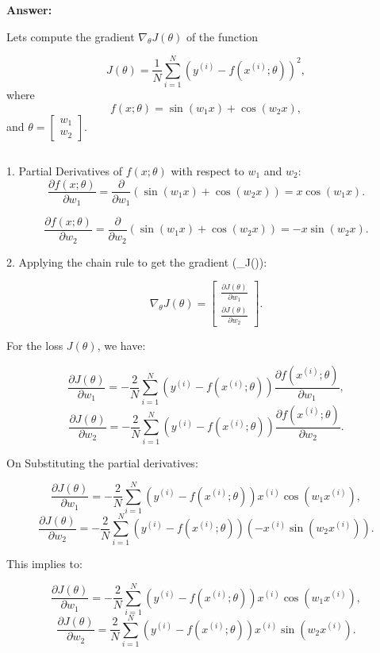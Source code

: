 \documentclass{article}
\begin{document}
\begin{tcolorbox}
\textbf{Answer: }



Lets compute the gradient $\nabla_\theta J(\theta)$ of the function 

\[
J(\theta) = \frac{1}{N} \sum_{i=1}^{N} \left( y^{(i)} - f(x^{(i)}; \theta) \right)^2,
\]
where 
\[
f(x; \theta) = \sin(w_1 x) + \cos(w_2 x),
\]
and $\theta = \begin{bmatrix} w_1 \\ w_2 \end{bmatrix}$.

\[\]

1. \textbf{}
Partial Derivatives of \(f(x; \theta)\) with respect to \(w_1\) and \(w_2\):
\[
\frac{\partial f(x; \theta)}{\partial w_1} = \frac{\partial}{\partial w_1} \left( \sin(w_1 x) + \cos(w_2 x) \right) = x \cos(w_1 x).
\]

\[
\frac{\partial f(x; \theta)}{\partial w_2} = \frac{\partial}{\partial w_2} \left( \sin(w_1 x) + \cos(w_2 x) \right) = -x \sin(w_2 x).
\]

2. \textbf{}
Applying the chain rule to get the gradient (\nabla_\theta J(\theta)):

\[
\nabla_\theta J(\theta) = \begin{bmatrix} \frac{\partial J(\theta)}{\partial w_1} \\ \frac{\partial J(\theta)}{\partial w_2} \end{bmatrix}.
\]

For the loss  \(J(\theta)\), we have:

\[
\frac{\partial J(\theta)}{\partial w_1} = -\frac{2}{N} \sum_{i=1}^{N} \left( y^{(i)} - f(x^{(i)}; \theta) \right) \frac{\partial f(x^{(i)}; \theta)}{\partial w_1},
\]
\[
\frac{\partial J(\theta)}{\partial w_2} = -\frac{2}{N} \sum_{i=1}^{N} \left( y^{(i)} - f(x^{(i)}; \theta) \right) \frac{\partial f(x^{(i)}; \theta)}{\partial w_2}.
\]

On Substituting the partial derivatives:

\[
\frac{\partial J(\theta)}{\partial w_1} = -\frac{2}{N} \sum_{i=1}^{N} \left( y^{(i)} - f(x^{(i)}; \theta) \right) x^{(i)} \cos(w_1 x^{(i)}),
\]
\[
\frac{\partial J(\theta)}{\partial w_2} = -\frac{2}{N} \sum_{i=1}^{N} \left( y^{(i)} - f(x^{(i)}; \theta) \right) (-x^{(i)} \sin(w_2 x^{(i)})).
\]

This implies to:

\[
\frac{\partial J(\theta)}{\partial w_1} = -\frac{2}{N} \sum_{i=1}^{N} \left( y^{(i)} - f(x^{(i)}; \theta) \right) x^{(i)} \cos(w_1 x^{(i)}),
\]
\[
\frac{\partial J(\theta)}{\partial w_2} = \frac{2}{N} \sum_{i=1}^{N} \left( y^{(i)} - f(x^{(i)}; \theta) \right) x^{(i)} \sin(w_2 x^{(i)}).
\]


\end{tcolorbox}
\end{document}
